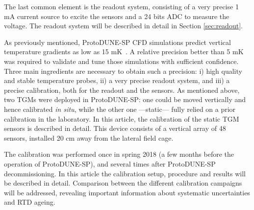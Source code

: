 The last common element is the readout system, consisting of a very precise 1 mA current source to excite the sensors and a 24 bits ADC to measure the voltage. The readout system will be described in detail in Section \ref{sec:readout}. 

As previously mentioned, ProtoDUNE-SP CFD simulations predict vertical temperature gradients as low as 15 mK~\cite{pdsp_tdr}. A relative precision better than 5 mK was required to validate and tune those simulations with sufficient confidence. Three main ingredients are necessary to obtain such a precision: i) high quality and stable temperature probes, ii) a very precise readout system, and iii) a precise calibration, both for the readout and the sensors. As mentioned above, two TGMs were deployed in ProtoDUNE-SP: one could be moved vertically and hence calibrated \textit{in situ}, while the other one ---static--- fully relied on a prior calibration in the laboratory. In this article, the calibration of the static TGM~\cite{tfm} sensors is described in detail. This device consists of a vertical array of 48 sensors, installed 20 cm away from the lateral field cage. 

The calibration was performed once in spring 2018  (a few months before the operation of ProtoDUNE-SP), and several times after ProtoDUNE-SP decommissioning. In this article the calibration setup, procedure and results will be described in detail. Comparison between the different calibration campaigns will be addressed, revealing important information about systematic uncertainties and RTD ageing.